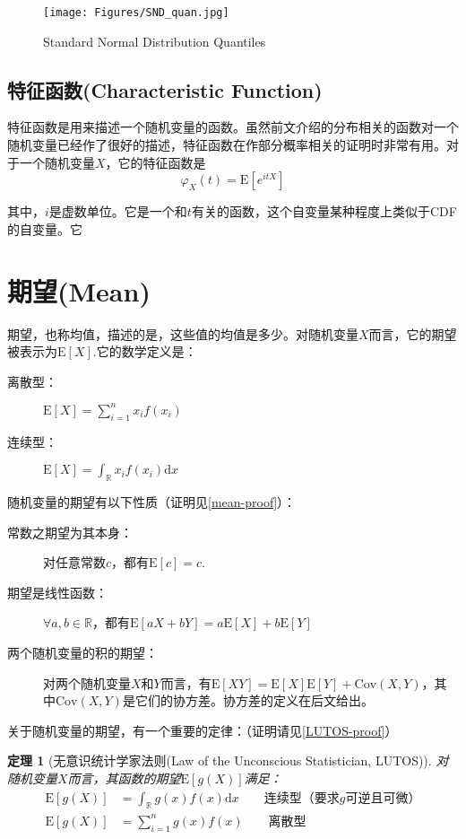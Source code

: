 \documentclass[UTF8]{ctexbook}
\newtheorem{theorem}{定理}[section] %
\begin{document}
\begin{figure}[ht]
	\centering
	\texttt{[image: Figures/SND\_quan.jpg]}
	\caption{Standard Normal Distribution Quantiles}
	\label{fig:StNor_quan}
\end{figure}

\newpage
\subsection{特征函数(Characteristic Function)}
\label{characteristic-function}
特征函数是用来描述一个随机变量的函数。虽然前文介绍的分布相关的函数对一个随机变量已经作了很好的描述，特征函数在作部分概率相关的证明时非常有用。对于一个随机变量$X$，它的特征函数是
\[
	\varphi_X(t)=\mathrm E[e^{itX}]
\]

其中，$i$是虚数单位。它是一个和$t$有关的函数，这个自变量某种程度上类似于CDF的自变量。它

\section{期望(Mean)}
\label{mean}
期望，也称均值，描述的是，这些值的均值是多少。对随机变量$X$而言，它的期望被表示为$\mathrm E[X]$.它的数学定义是：
\begin{description}
	\item [离散型：]
	$\mathrm E[X]=\sum_{i=1}^nx_if(x_i)$
	\item [连续型：]
	$\mathrm E[X]=\int_{\mathbb{R}}x_if(x_i)\mathrm dx$
\end{description}

随机变量的期望有以下性质（证明见\ref{mean-proof}）：
\begin{description}
	\item [常数之期望为其本身：]
	对任意常数$c$，都有$\mathrm E[c]=c$.
	\item [期望是线性函数：]
	$\forall a,b\in\mathbb{R}$，都有$\mathrm E[aX+bY]=a\mathrm E[X]+b\mathrm E[Y]$
	\item [两个随机变量的积的期望：]
	对两个随机变量$X$和$Y$而言，有$\mathrm E[XY]=\mathrm E[X]\mathrm E[Y]+\mathrm{Cov}(X,Y)$，其中$\mathrm{Cov}(X,Y)$是它们的协方差。协方差的定义在后文给出。
\end{description}

关于随机变量的期望，有一个重要的定律：（证明请见\ref{LUTOS-proof}）
\begin{theorem}[无意识统计学家法则(Law of the Unconscious Statistician, LUTOS)]
\label{theorem:LUTOS}
	对随机变量$X$而言，其函数的期望$\mathrm E[g(X)]$满足：
	\begin{align*}
		\mathrm E[g(X)]&=\int_{\mathbb{R}}g(x)f(x)\mathrm dx\qquad\text{连续型（要求$g$可逆且可微）} \\
		\mathrm E[g(X)]&=\sum_{i=1}^ng(x)f(x)\qquad\text{离散型}
	\end{align*}
\end{theorem}
\end{document}
